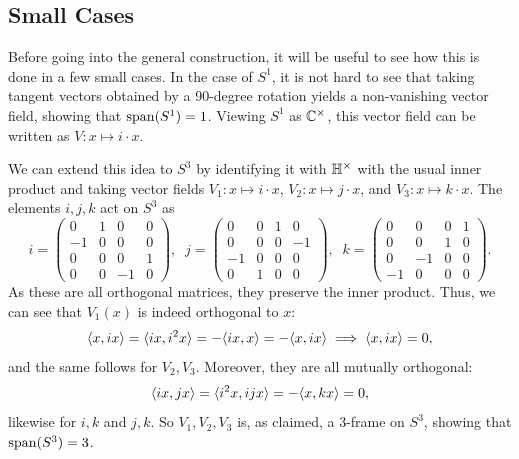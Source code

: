 \documentclass{amsart}
\begin{document}
	\subsection{Small Cases} Before going into the general construction, it will be useful to see how this is done in a few small cases. In the case of $S^1$, it is not hard to see that taking tangent vectors obtained by a 90-degree rotation yields a non-vanishing vector field, showing that $\operatorname{span}(S^1)=1$. Viewing $S^1$ as $\mathbb{C}^{\times}$, this vector field can be written as $V:x\mapsto i\cdot x$.
	
	We can extend this idea to $S^3$ by identifying it with $\mathbb{H}^{\times}$ with the usual inner product and taking vector fields $V_1:x\mapsto i\cdot x$, $V_2:x\mapsto j\cdot x$, and $V_3:x\mapsto k \cdot x$. The elements $i,j,k$ act on $S^3$ as
	$$
	i = \begin{pmatrix}
		0 & 1 & 0 & 0\\
		-1 & 0 & 0 & 0\\
		0 & 0 & 0 & 1\\
		0 & 0 & -1 & 0
	\end{pmatrix}, \;\;
	j = \begin{pmatrix}
		0 & 0 & 1 & 0\\
		0 & 0 & 0 & -1\\
		-1 & 0 & 0 & 0\\
		0 & 1 & 0 & 0
	\end{pmatrix}, \;\;
	k = \begin{pmatrix}
		0 & 0 & 0 & 1\\
		0 & 0 & 1 & 0\\
		0 & -1 & 0 & 0\\
		-1 & 0 & 0 & 0
	\end{pmatrix}.   
	$$
	As these are all orthogonal matrices, they preserve the inner product. Thus, we can see that $V_1(x)$ is indeed orthogonal to $x$:
	$$
	\langle x,ix\rangle = \langle ix,i^2x\rangle = -\langle ix,x\rangle = -\langle x,ix\rangle \implies \langle x,ix\rangle=0,
	$$
	and the same follows for $V_2,V_3$. Moreover, they are all mutually orthogonal:
	$$
	\langle ix,jx\rangle = \langle i^2x,ijx\rangle = -\langle x,kx\rangle = 0, 
	$$
	likewise for $i,k$ and $j,k$. So $V_1,V_2,V_3$ is, as claimed, a 3-frame on $S^3$, showing that $\operatorname{span}(S^3)=3$.\\
	
\end{document}
